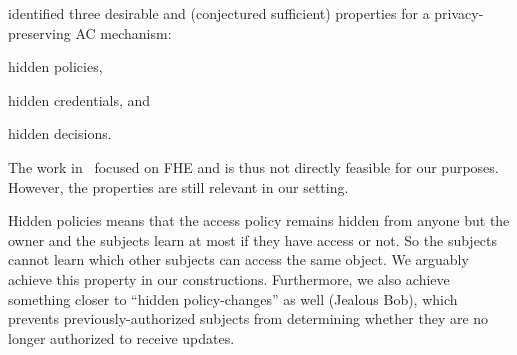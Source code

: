 
\citet{TowardsPPACwHPHCHD} identified three desirable and (conjectured 
sufficient) properties for a privacy-preserving \ac{AC} mechanism:
\begin{inparablank}
\item hidden policies,
\item hidden credentials, and
\item hidden decisions.
\end{inparablank}
The work in~\cite{TowardsPPACwHPHCHD} focused on \ac{FHE} and is thus not 
directly feasible for our purposes.
However, the properties are still relevant in our setting.

Hidden policies means that the access policy remains hidden from anyone but 
the owner and the subjects learn at most if they have access or not.
So the subjects cannot learn which other subjects can access the same object.
We arguably achieve this property in our constructions.
Furthermore, we also achieve something closer to \enquote{hidden 
  policy-changes} as well (Jealous Bob), which prevents previously-authorized 
subjects from determining whether they are no longer authorized to receive 
updates.


